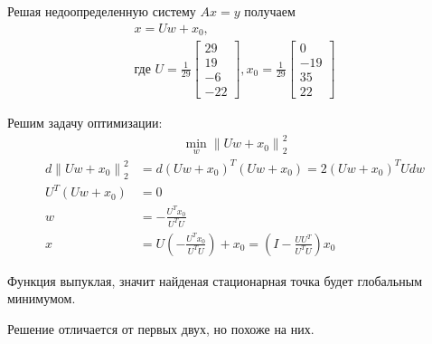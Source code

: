 \documentclass{article}
\newcommand{\norm}[1]{\left\lVert#1\right\rVert}
\begin{document}
    Решая недоопределенную систему $Ax = y$ получаем
    \begin{align*}
        x = Uw + x_0,\\ \text{где }
        U = \frac{1}{29}\left[\begin{matrix} 29\\ 19\\ -6\\ -22 \end{matrix}\right], 
        x_0 = \frac{1}{29}\left[\begin{matrix} 0\\ -19\\ 35\\ 22 \end{matrix}\right]
    \end{align*}
    
    Решим задачу оптимизации:
    \begin{align*}
        \min_w \norm{Uw + x_0}_2^2
    \end{align*}
    \begin{align*}
        d\norm{Uw + x_0}_2^2 &= d(Uw + x_0)^T(Uw + x_0) = 2(Uw + x_0)^TUdw\\
        U^T(Uw + x_0) &= 0\\
        w &= -\frac{U^Tx_0}{U^TU}\\
        x &= U\left(-\frac{U^Tx_0}{U^TU}\right) + x_0 = 
        \left(I - \frac{UU^T}{U^TU}\right)x_0
    \end{align*}
    
    Функция выпуклая, значит найденая стационарная точка будет глобальным минимумом.    
    
    
    
    Решение отличается от первых двух, но похоже на них.
\end{document}
